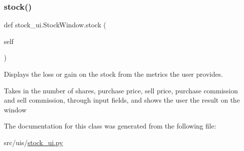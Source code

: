 \subsubsection{\texorpdfstring{stock()}{stock()}}
{\footnotesize\ttfamily def stock\+\_\+ui.\+Stock\+Window.\+stock (\begin{DoxyParamCaption}\item[{}]{self }\end{DoxyParamCaption})}



Displays the loss or gain on the stock from the metrics the user provides. 

Takes in the number of shares, purchase price, sell price, purchase commission and sell commission, through input fields, and shows the user the result on the window 

The documentation for this class was generated from the following file\+:\begin{DoxyCompactItemize}
\item 
src/uis/\hyperlink{stock__ui_8py}{stock\+\_\+ui.\+py}\end{DoxyCompactItemize}

